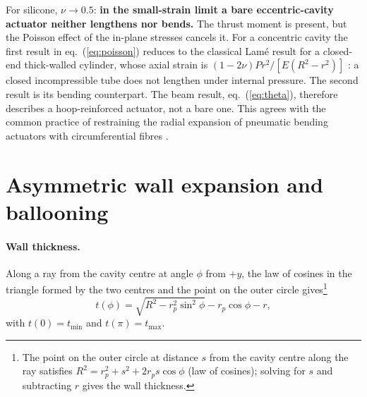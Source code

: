 \documentclass[12pt,a4paper,oneside]{report}
\numberwithin{equation}{chapter}
\numberwithin{figure}{chapter}
\numberwithin{table}{chapter}
\newcommand{\rp}{r_p}
\newcommand{\tmin}{t_{\min}}
\newcommand{\tmax}{t_{\max}}
\begin{document}
For silicone, $\nu\to0.5$: \textbf{in the small-strain limit a bare eccentric-cavity actuator neither
lengthens nor bends.} The thrust moment is present, but the Poisson effect of the in-plane stresses cancels
it. For a concentric cavity the first result in eq.~(\ref{eq:poisson}) reduces to the classical Lam\'e
result for a closed-end thick-walled cylinder, whose axial strain is
$(1-2\nu)Pr^2/[E(R^2-r^2)]$ \cite{timoshenko1970}: a closed incompressible tube does not lengthen under
internal pressure. The second result is its bending counterpart. The beam result,
eq.~(\ref{eq:theta}), therefore describes a hoop-reinforced actuator, not a bare one. This agrees with the
common practice of restraining the radial expansion of pneumatic bending actuators with circumferential
fibres \cite{polygerinos2015,connolly2017}.

\section{Asymmetric wall expansion and ballooning}\label{sec:wall}
\paragraph{Wall thickness.} Along a ray from the cavity centre at angle $\phi$ from $+y$, the law of cosines
in the triangle formed by the two centres and the point on the outer circle
gives\footnote{The point on the outer circle at distance $s$ from the cavity centre along the ray satisfies
$R^2=\rp^2+s^2+2\rp s\cos\phi$ (law of cosines); solving for $s$ and subtracting $r$ gives the wall
thickness.}
\begin{equation}
t(\phi) = \sqrt{R^2-\rp^2\sin^2\phi} - \rp\cos\phi - r, \label{eq:tphi}
\end{equation}
with $t(0)=\tmin$ and $t(\pi)=\tmax$.
\end{document}
